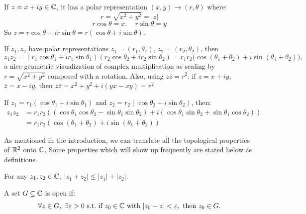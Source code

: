 \documentclass[11pt]{article}
\begin{document}
\begin{definition}
If $z = x + iy \in {\mathbb{C}}$, it has a polar representation $(x,y) \to (r,\theta)$ where:
\[
r = \sqrt{x^2+y^2} = |z|
\]
\[
r \cos\theta = x, \quad r \sin\theta = y
\]
So $z = r\cos\theta + i r\sin\theta = r(\cos\theta + i\sin\theta)$.

If $z_1, z_2$ have polar representations $z_1 = (r_1,\theta_1)$, $z_2 = (r_2,\theta_2)$, then
\[
z_1 z_2 = (r_1\cos\theta_1 + ir_1\sin\theta_1)(r_2\cos\theta_2 + ir_2\sin\theta_2) = r_1 r_2\big(\cos(\theta_1+\theta_2) + i\sin(\theta_1+\theta_2)\big),
\]
a nice geometric visualization of complex multiplication as scaling by $r = \sqrt{x^2+y^2}$ composed with a rotation. Also, using $z\overline{z} = r^2$: if $z = x+iy$, $\overline{z} = x-iy$, then $z\overline{z} = x^2+y^2+i(yx-xy) = r^2$.
\end{definition}

\begin{proposition}
If $z_1 = r_1(\cos\theta_1 + i\sin\theta_1)$ and $z_2 = r_2(\cos\theta_2 + i\sin\theta_2)$, then:
\begin{align*}
z_1 z_2 &= r_1 r_2 \left( (\cos\theta_1 \cos\theta_2 - \sin\theta_1 \sin\theta_2) + i (\cos\theta_1 \sin\theta_2 + \sin\theta_1 \cos\theta_2) \right) \\
&= r_1 r_2 \left( \cos(\theta_1 + \theta_2) + i \sin(\theta_1 + \theta_2) \right)
\end{align*}
\end{proposition}

As mentioned in the introduction, we can translate all the topological properties of ${\mathbb{R}}^2$ onto ${\mathbb{C}}$. Some properties which will show up frequently are stated below as definitions. 

\begin{definition}
For any $z_1, z_2 \in {\mathbb{C}}$, $|z_1 + z_2| \le |z_1| + |z_2|$.
\end{definition}

\begin{definition}
A set $G \subseteq {\mathbb{C}}$ is open if:
\[
\forall z \in G,\ \exists \varepsilon > 0 \text{ s.t.\ if } z_0 \in {\mathbb{C}} \text{ with } |z_0 - z| < \varepsilon, \text{ then } z_0 \in G.
\]
\end{definition}
\end{document}
